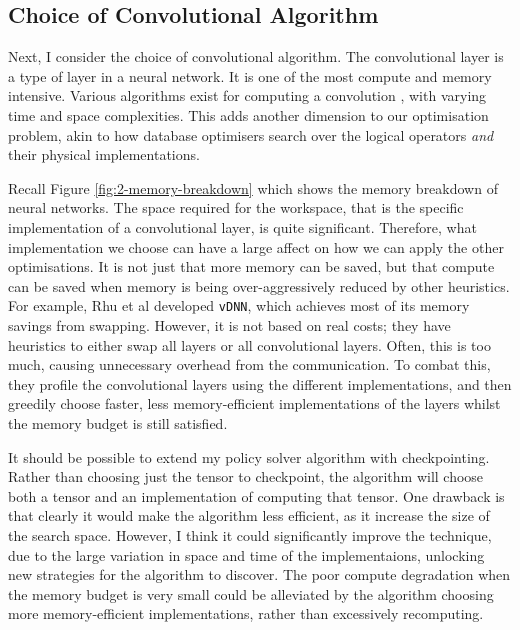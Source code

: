 \subsection{Choice of Convolutional Algorithm}
Next, I consider the choice of convolutional algorithm.
The convolutional layer is a type of layer in a neural network.
It is one of the most compute and memory intensive.
Various algorithms exist for computing a convolution \cite{Xu2018-convs, Li2016-convs}, with varying time and space complexities.
This adds another dimension to our optimisation problem, akin to how database optimisers search over the logical operators \textit{and} their physical implementations.

Recall Figure \ref{fig:2-memory-breakdown} which shows the memory breakdown of neural networks.
The space required for the workspace, that is the specific implementation of a convolutional layer, is quite significant.
Therefore, what implementation we choose can have a large affect on how we can apply the other optimisations.
It is not just that more memory can be saved, but that compute can be saved when memory is being over-aggressively reduced by other heuristics.
For example, Rhu et al \cite{Rhu2016} developed \texttt{vDNN}, which achieves most of its memory savings from swapping.
However, it is not based on real costs; they have heuristics to either swap all layers or all convolutional layers.
Often, this is too much, causing unnecessary overhead from the communication.
To combat this, they profile the convolutional layers using the different implementations, and then greedily choose faster, less memory-efficient implementations of the layers whilst the memory budget is still satisfied.

It should be possible to extend my policy solver algorithm with checkpointing.
Rather than choosing just the tensor to checkpoint, the algorithm will choose both a tensor and an implementation of computing that tensor.
One drawback is that clearly it would make the algorithm less efficient, as it increase the size of the search space.
However, I think it could significantly improve the technique, due to the large variation in space and time of the implementaions, unlocking new strategies for the algorithm to discover.
The poor compute degradation when the memory budget is very small could be alleviated by the algorithm choosing more memory-efficient implementations, rather than excessively recomputing.
